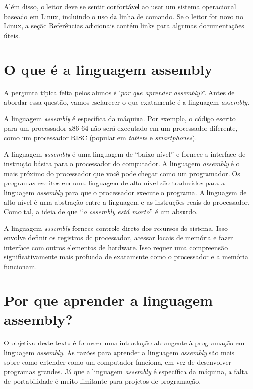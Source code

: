 Além disso, o leitor deve se sentir confortável ao usar um sistema operacional baseado em Linux, incluindo o uso da linha de comando. Se o leitor for novo no Linux, a seção Referências adicionais contém links para algumas documentações úteis.

\section{O que é a linguagem assembly}
A pergunta típica feita pelos alunos é '\textit{por que aprender \textit{assembly}?}'. Antes de abordar essa questão, vamos esclarecer o que exatamente é a linguagem \textit{assembly}.

A linguagem \textit{assembly} é específica da máquina. Por exemplo, o código escrito para um processador x86-64 não será executado em um processador diferente, como um processador RISC (popular em \textit{tablets} e \textit{smartphones}).

A linguagem \textit{assembly} é uma linguagem de ``baixo nível'' e fornece a interface de instrução básica para o processador do computador. A linguagem \textit{assembly} é o mais próximo do processador que você pode chegar como um programador. Os programas escritos em uma linguagem de alto nível são traduzidos para a linguagem \textit{assembly} para que o processador execute o programa. A linguagem de alto nível é uma abstração entre a linguagem e as instruções reais do processador. Como tal, a ideia de que ``\textit{o assembly está morto}'' é um absurdo.

A linguagem \textit{assembly} fornece controle direto dos recursos do sistema. Isso envolve definir os registros do processador, acessar locais de memória e fazer interface com outros elementos de hardware. Isso requer uma compreensão significativamente mais profunda de exatamente como o processador e a memória funcionam.

\section{Por que aprender a linguagem assembly?}
O objetivo deste texto é fornecer uma introdução abrangente à programação em linguagem \textit{assembly}. As razões para aprender a linguagem \textit{assembly} são mais sobre como entender como um computador funciona, em vez de desenvolver programas grandes. Já que a linguagem \textit{assembly} é específica da máquina, a falta de portabilidade é muito limitante para projetos de programação.

